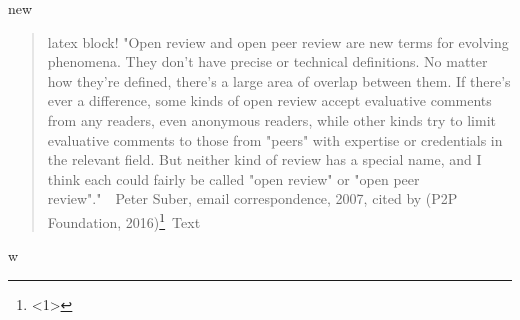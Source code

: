 new\begin{quote}

latex block! "Open review and open peer review are new terms for evolving phenomena. They don't have precise or technical definitions. No matter how they're defined, there's a large area of overlap between them. If there's ever a difference, some kinds of open review accept evaluative comments from any readers, even anonymous readers, while other kinds try to limit evaluative comments to those from "peers" with expertise or credentials in the relevant field. But neither kind of review has a special name, and I think each could fairly be called "open review" or "open peer review"."  Peter Suber, email correspondence, 2007, cited by (P2P Foundation, 2016)\footnote{<1>} Text\end{quote}w 
